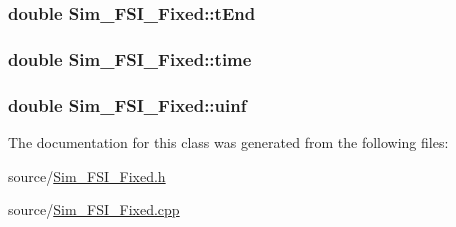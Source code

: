 \subsubsection[{t\+End}]{\setlength{\rightskip}{0pt plus 5cm}double Sim\+\_\+\+F\+S\+I\+\_\+\+Fixed\+::t\+End\hspace{0.3cm}{\ttfamily [protected]}}\label{class_sim___f_s_i___fixed_aa70a1ca13502295034e8c74b5d88413e}
\hypertarget{class_sim___f_s_i___fixed_a3cfdaa1a00829b2784bcd6fccb3c09d2}{}
\subsubsection[{time}]{\setlength{\rightskip}{0pt plus 5cm}double Sim\+\_\+\+F\+S\+I\+\_\+\+Fixed\+::time\hspace{0.3cm}{\ttfamily [protected]}}\label{class_sim___f_s_i___fixed_a3cfdaa1a00829b2784bcd6fccb3c09d2}
\hypertarget{class_sim___f_s_i___fixed_adbebdb69690216b89cf81339ac4a5e0e}{}
\subsubsection[{uinf}]{\setlength{\rightskip}{0pt plus 5cm}double Sim\+\_\+\+F\+S\+I\+\_\+\+Fixed\+::uinf\hspace{0.3cm}{\ttfamily [protected]}}\label{class_sim___f_s_i___fixed_adbebdb69690216b89cf81339ac4a5e0e}


The documentation for this class was generated from the following files\+:\begin{DoxyCompactItemize}
\item 
source/\hyperlink{_sim___f_s_i___fixed_8h}{Sim\+\_\+\+F\+S\+I\+\_\+\+Fixed.\+h}\item 
source/\hyperlink{_sim___f_s_i___fixed_8cpp}{Sim\+\_\+\+F\+S\+I\+\_\+\+Fixed.\+cpp}\end{DoxyCompactItemize}
